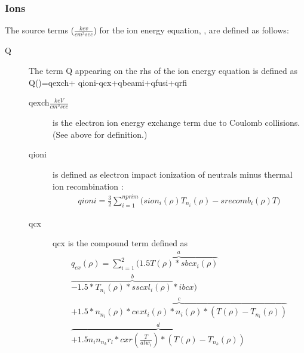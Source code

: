 \subsubsection{Ions}

The source terms ($\frac{kev}{cm^3sec}$) for the ion energy equation,
, are defined as follows:
\begin{description}
 \item [Q ] The term Q appearing on the rhs of the ion energy 
 equation is defined as
 \beq
 Q(\rho)=qexch+ qioni-qcx+qbeami+qfusi+qrfi
 \eeq
 \begin{description}  %
  \item [qexch$\frac{keV}{cm^3sec}$] is the electron ion energy exchange term
  due to Coulomb collisions. (See above for definition.)
  \item [qioni] is defined as electron impact ionization of neutrals minus
  thermal ion recombination :
  \begin{multline}
   qioni = \frac{3}{2}\sum_{i=1}^{nprim} \bigg ( 
    sion_i(\rho)T_{n_i} (\rho)
    - srecomb_i(\rho) T \bigg )
  \end{multline}
  \item[qcx ] qcx is the compound term  defined as 
  \begin{multline}
   q_{cx}(\rho)=\sum_{i=1}^2\bigg (\overbrace{1.5T(\rho)*sbcx_i(\rho)}^a \\
   \overbrace{ -1.5*T_{n_i}(\rho)*sscxl_i(\rho)*ibcx}^b \bigg)\\ 
   \overbrace{ +1.5*n_{n_i}(\rho)*cext_i(\rho)*n_i(\rho)*
   (T(\rho)-T_{n_i}(\rho))}^c \\
   \overbrace{+1.5n_i n_{n_k} r_l*cxr(\frac{T}{atw_i})*
    (T(\rho)-T_{n_k}(\rho))}^d
  \end{multline}
\end{description}
\end{description}
